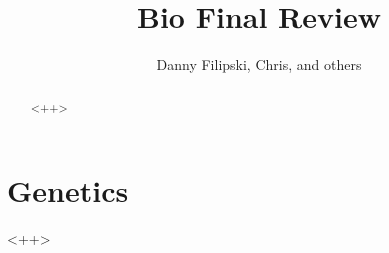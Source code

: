 \documentclass{article}
\title{Bio Final Review}
\author{Danny Filipski, Chris, and others}
\begin{document}
\maketitle

\section{Genetics}

\begin{abstract}
<++>
\end{abstract}

<++>


\printbibliography
\end{document}
